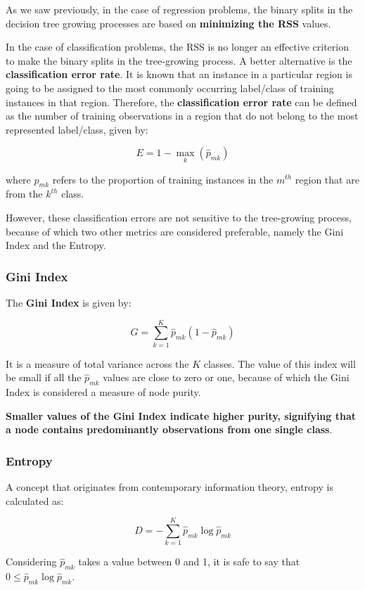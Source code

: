 As we saw previously, in the case of regression problems, the binary splits in the decision tree growing processes are based on \textbf{minimizing the RSS} values.

In the case of classification problems, the RSS is no longer an effective criterion to make the binary splits in the tree-growing process.
A better alternative is the \textbf{classification error rate}. It is known that an instance in a particular region is going to be assigned to the most commonly occurring label/class of training instances in that region. Therefore, the \textbf{classification error rate} can be defined as the number of training observations in a region that do not belong to the most represented label/class, given by:

$$
    E = 1 - \max_k(\hat{p}_{mk})
$$

where $\hat{p}_{mk}$ refers to the proportion of training instances in the $m^{th}$ region that are from the $k^{th}$ class.

However, these classification errors are not sensitive to the tree-growing process, because of which two other metrics are considered preferable, namely the Gini Index and the Entropy.

\subsubsection{Gini Index}

The \textbf{Gini Index} is given by:

$$
    G = \sum_{k=1}^{K} \hat{p}_{mk} (1 - \hat{p}_{mk})
$$

It is a measure of total variance across the $K$ classes.
The value of this index will be small if all the $\hat{p}_{mk}$ values are close to zero or one,
because of which the Gini Index is considered a measure of node purity.

\textbf{Smaller values of the Gini Index indicate higher purity, signifying that a node contains predominantly observations from one single class}.

\subsubsection{Entropy}

A concept that originates from contemporary information theory, entropy is calculated as:

$$
    D = - \sum_{k=1}^{K} \hat{p}_{mk} \log \hat{p}_{mk}
$$

Considering $\hat{p}_{mk}$ takes a value between 0 and 1, it is safe to say that $ 0 \leq \hat{p}_{mk} \log \hat{p}_{mk}$.

